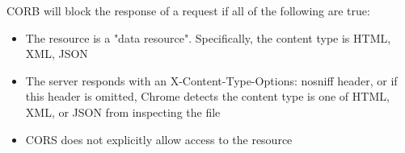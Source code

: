 CORB will block the response of a request if all of the following are true:
\begin{itemize}
	\item The resource is a "data resource". Specifically, the content type is HTML, XML, JSON
	\item The server responds with an X-Content-Type-Options: nosniff header, or if this header is omitted, Chrome detects the content type is one of HTML, XML, or JSON from inspecting the file
	\item CORS does not explicitly allow access to the resource
\end{itemize}

